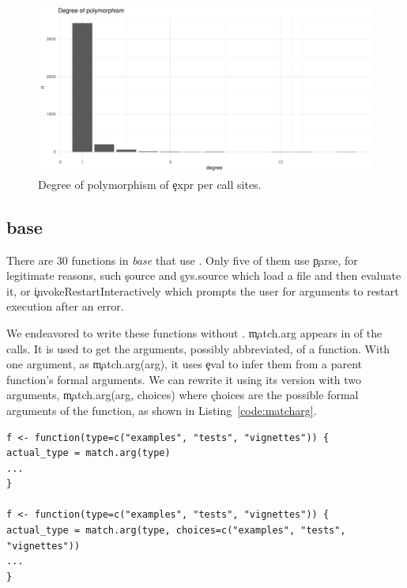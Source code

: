 \documentclass[conference]{IEEEtran}
\begin{document}
\begin{figure}[!h]
    \includegraphics[width=\columnwidth]{polymorphism}
    \caption{Degree of polymorphism of \c{expr} per call sites.} \label{fig:polymorphism}
\end{figure}

\subsection{base}

There are 30 functions in \emph{base} that use \eval. Only five of them use \c{parse}, for legitimate reasons, such \c{source} and \c{sys.source} which load a file and then evaluate it, or \c{invokeRestartInteractively} which prompts the user for arguments to restart execution after an error.

We endeavored  to write these functions without \eval. \c{match.arg} appears in \MatchArgPercent of the \eval calls. It is used to get the arguments, possibly abbreviated, of a function. With one argument, as \c{match.arg(arg)}, it uses \c{eval} to infer them from a parent function's formal arguments. We can rewrite it using its version with two arguments, \c{match.arg(arg, choices)} where \c{choices} are the possible formal arguments of the function, as shown in Listing~\ref{code:matcharg}.

\begin{lstlisting}[caption={Rewriting \c{match.arg} without \eval}, label=code:matcharg]
f <- function(type=c("examples", "tests", "vignettes")) {
actual_type = match.arg(type)
...
}

f <- function(type=c("examples", "tests", "vignettes")) {
actual_type = match.arg(type, choices=c("examples", "tests", "vignettes"))
...
}
\end{lstlisting}
\end{document}
